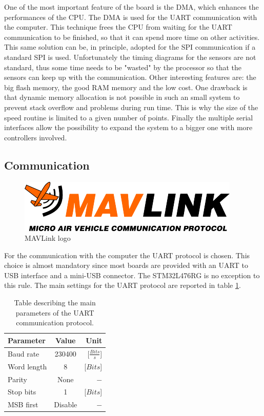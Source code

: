 \documentclass[12pt,a4paper]{article}
\begin{document}
One of the most important feature of the board is the DMA, which enhances the performances of the CPU. The DMA is used for the UART communication with the computer. This technique frees the CPU from waiting for the UART communication to be finished, so that it can spend more time on other activities. This same solution can be, in principle, adopted for the SPI communication if a standard SPI is used. Unfortunately the timing diagrams for the sensors are not standard, thus some time needs to be "wasted" by the processor so that the sensors can keep up with the communication.
Other interesting features are: the big flash memory, the good RAM memory and the low cost. One drawback is that dynamic memory allocation is not possible in such an small system to prevent stack overflow and problems during run time. This is why the size of the speed routine is limited to a given number of points.
Finally the multiple serial interfaces allow the possibility to expand the system to a bigger one with more controllers involved.

\subsection{Communication}

\begin{figure}
	\includegraphics[width=\linewidth]{fig/MAVLink_logo.png}
	\caption{MAVLink logo}\label{fig:MAVLink_logo}
\end{figure}
For the communication with the computer the UART protocol is chosen. This choice is almost mandatory since most boards are provided with an UART to USB interface and a mini-USB connector. The STM32L476RG is no exception to this rule. The main settings for the UART protocol are reported in table \ref{tab:UART}.

\begin{table}[H]
	\centering
	\begin{tabular}{l||c|r} 
		\textbf{Parameter} &\textbf{Value} &\textbf{Unit}\\ 
		\hline
		\hline 
		Baud rate & 230400 & [$\frac{Bits}{s}$] \\ 
		\hline 
		Word length & 8 & [$Bits$] \\ 
		\hline 
		Parity & None & $-$\\ 
		\hline 
		Stop bits & 1 & [$Bits$]\\ 
		\hline 
		MSB first & Disable & $-$  \\ 
	\end{tabular} 
	\caption{Table describing the main parameters of the UART communication protocol.}
	\label{tab:UART}
\end{table}
\end{document}
